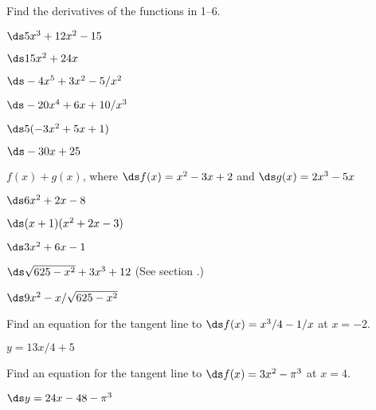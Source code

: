 \begin{exercises}

Find the derivatives of the functions in 1--6.

\begin{exercise} $\ds 5x^3+12x^2-15$
\begin{answer} $\ds 15x^2+24x$
\end{answer}\end{exercise}

\begin{exercise} $\ds -4x^5 + 3x^2 - 5/x^2$
\begin{answer} $\ds -20x^4+6x+10/x^3$
\end{answer}\end{exercise}

\begin{exercise} $\ds 5(-3x^2 + 5x + 1)$
\begin{answer} $\ds -30x+25$
\end{answer}\end{exercise}

\begin{exercise} $f(x)+g(x)$, where $\ds f(x)=x^2-3x+2$ and $\ds g(x)=2x^3-5x$
\begin{answer} $\ds 6x^2+2x-8$
\end{answer}\end{exercise}

\begin{exercise} $\ds (x+1)(x^2+2x-3)$
\begin{answer} $\ds 3x^2+6x-1$
\end{answer}\end{exercise}

\begin{exercise} $\ds \sqrt{625-x^2}+3x^3+12$ (See section .)
\begin{answer} $\ds 9x^2-x/\sqrt{625-x^2}$
\end{answer}\end{exercise}

\begin{exercise}
 Find an equation for the tangent line to $\ds f(x) = x^3/4 - 1/x$ at $x=-2$.
\begin{answer} $y=13x/4+5$
\end{answer}\end{exercise}

\begin{exercise} Find an equation for 
the tangent line to $\ds f(x)= 3x^2 - \pi ^3$ at $x= 4$.
\begin{answer} $\ds y=24x-48-\pi^3$
\end{answer}\end{exercise}


\end{exercises}
